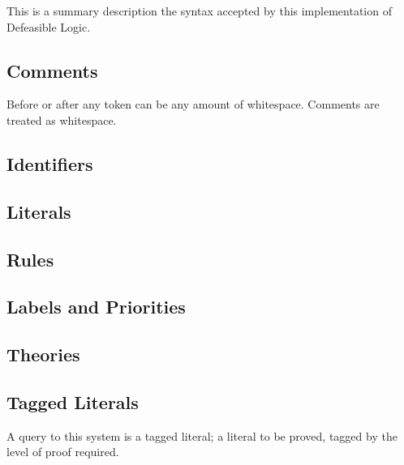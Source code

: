

This is a summary description the syntax accepted by
this implementation of Defeasible Logic.

\subsection{Comments}

   Before or after any token can be any amount of whitespace.
   Comments are treated as whitespace.

   
   
 
\subsection{Identifiers}
 
   
   

\subsection{Literals}
   
   
   

\subsection{Rules}
   
   
   

\subsection{Labels and Priorities}
   
   
   

\subsection{Theories}
   
   

\subsection{Tagged Literals}

   A query to this system is a tagged literal; a literal to be
   proved, tagged by the level of proof required.

   
